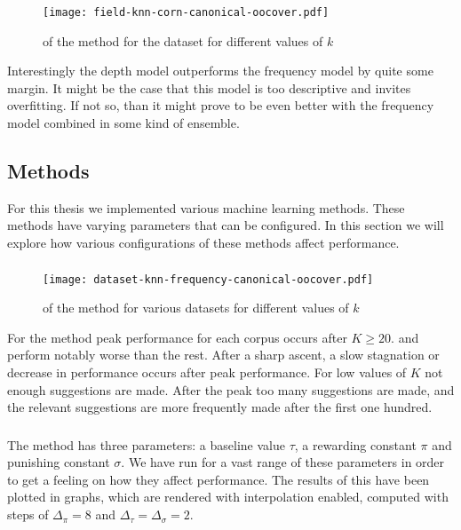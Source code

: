 \begin{figure}[H]
  \centering
  \texttt{[image: field-knn-corn-canonical-oocover.pdf]}
  \caption{\oocover of the \knn method for the \corn dataset for different values of $k$}
\end{figure}

Interestingly the depth model outperforms the frequency model by quite some margin.
It might be the case that this model is too descriptive and invites overfitting.
If not so, than it might prove to be even better with the frequency model combined in some kind of ensemble.

\subsection{Methods}
For this thesis we implemented various machine learning methods.
These methods have varying parameters that can be configured.
In this section we will explore how various configurations of these methods affect performance.

\subsubsection{\knn}
\begin{figure}[H]
  \centering
  \texttt{[image: dataset-knn-frequency-canonical-oocover.pdf]}
  \caption{\oocover of the \knn method for various datasets for different values of $k$}
\end{figure}

For the \knn method peak \oocover performance for each corpus occurs after $K\geq20$.
\corn and \mathclasses perform notably worse than the rest.
After a sharp ascent, a slow stagnation or decrease in performance occurs after peak performance.
For low values of $K$ not enough suggestions are made.
After the peak too many suggestions are made, and the relevant suggestions are more frequently made after the first one hundred.

\subsubsection{\nb}
The \nb method has three parameters: a baseline value $\tau$, a rewarding constant $\pi$ and punishing constant $\sigma$.
We have run \nb for a vast range of these parameters in order to get a feeling on how they affect performance.
The results of this have been plotted in graphs, which are rendered with interpolation enabled,
computed with steps of $\Delta_\pi = 8$ and $\Delta_\tau = \Delta_\sigma = 2$.

